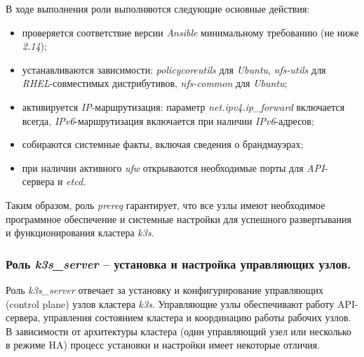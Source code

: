 В ходе выполнения роли выполняются следующие основные действия:
\begin{itemize}
  \item проверяется соответствие версии \textit{Ansible} минимальному требованию (не ниже \textit{2.14});
  \item устанавливаются зависимости: \textit{policycoreutils} для \textit{Ubuntu}, \textit{nfs-utils} для \textit{RHEL}-совместимых дистрибутивов, \textit{nfs-common} для \textit{Ubuntu};
  \item активируется \textit{IP}-маршрутизация: параметр \textit{net.ipv4.ip\_forward} включается всегда, \textit{IPv6}-маршрутизация включается при наличии \textit{IPv6}-адресов;
  \item собираются системные факты, включая сведения о брандмауэрах;
  \item при наличии активного \textit{ufw} открываются необходимые порты для \textit{API}-сервера и \textit{etcd}.
\end{itemize}

Таким образом, роль \textit{prereq} гарантирует, что все узлы имеют необходимое программное обеспечение и системные настройки для успешного развертывания и функционирования кластера \textit{k3s}.

\subsubsection{Роль \textit{k3s\_server} -- установка и настройка управляющих узлов.}
Роль \textit{k3s\_server} отвечает за установку и конфигурирование управляющих (control plane) узлов кластера \textit{k3s}. Управляющие узлы обеспечивают работу API-сервера, управления состоянием кластера и координацию работы рабочих узлов. В зависимости от архитектуры кластера (один управляющий узел или несколько в режиме HA) процесс установки и настройки имеет некоторые отличия.

